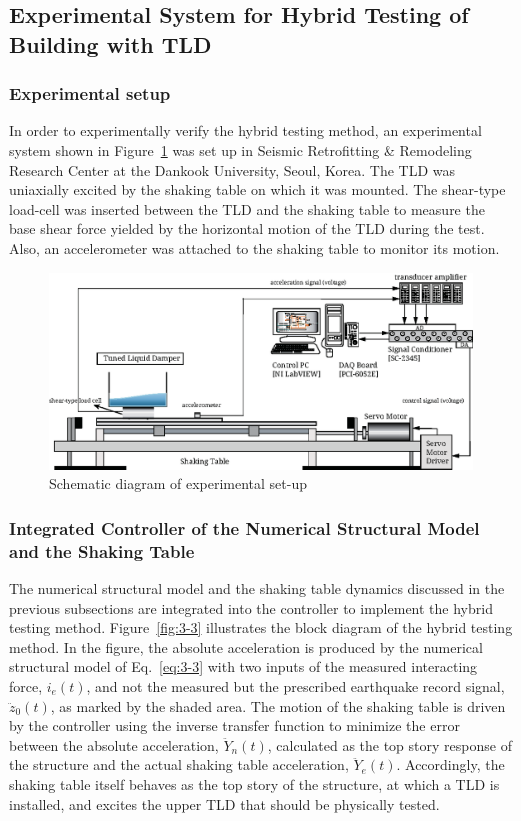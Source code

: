 \subsection{Experimental System for Hybrid Testing of Building with TLD}
\subsubsection{Experimental setup}

In order to experimentally verify the hybrid testing method, an experimental system shown in Figure~\ref{fig:3-2} was set up in Seismic Retrofitting \& Remodeling Research Center at the Dankook University, Seoul, Korea. The TLD was uniaxially excited by the shaking table on which it was mounted. The shear-type load-cell was inserted between the TLD and the shaking table to measure the base shear force yielded by the horizontal motion of the TLD during the test. Also, an accelerometer was attached to the shaking table to monitor its motion.

\begin{figure}[ht]
\centering
\includegraphics[scale =1] {figure/3-2.eps}
\caption{Schematic diagram of experimental set-up}
\label{fig:3-2}
\end{figure}

\subsubsection{Integrated Controller of the Numerical Structural Model and the Shaking Table}
The numerical structural model and the shaking table dynamics discussed in the previous subsections are integrated into the controller to implement the hybrid testing method. Figure~\ref{fig:3-3} illustrates the block diagram of the hybrid testing method. In the figure, the absolute acceleration is produced by the numerical structural model of Eq.~\eqref{eq:3-3} with two inputs of the measured interacting force, $i_{e}(t)$, and not the measured but the prescribed earthquake record signal, $\ddot{z}_{0}(t)$, as marked by the shaded area. The motion of the shaking table is driven by the controller using the inverse transfer function to minimize the error between the absolute acceleration, $\ddot{Y}_{n}(t)$, calculated as the top story response of the structure and the actual shaking table acceleration, $\ddot{Y}_{e}(t)$. Accordingly, the shaking table itself behaves as the top story of the structure, at which a TLD is installed, and excites the upper TLD that should be physically tested.

